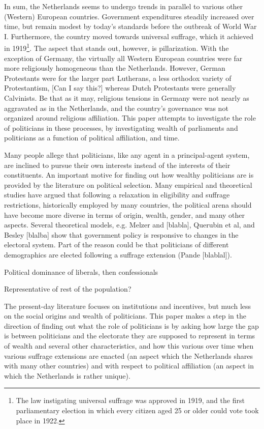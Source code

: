 In sum, the Netherlands seems to undergo trends in parallel to various other (Western) European countries. Government expenditures steadily increased over time, but remain modest by today's standards before the outbreak of World War I. Furthermore, the country moved towards universal suffrage, which it achieved in 1919\footnote{The law instigating universal suffrage was approved in 1919, and the first parliamentary election in which every citizen aged 25 or older could vote took place in 1922.}. The aspect that stands out, however, is pillarization. With the exception of Germany, the virtually all Western European countries were far more religiously homogeneous than the Netherlands. However, German Protestants were for the larger part Lutherans, a less orthodox variety of Protestantism, [Can I say this?] whereas Dutch Protestants were generally Calvinists. Be that as it may, religious tensions in Germany were not nearly as aggravated as in the Netherlands, and the country's governance was not organized around religious affiliation. This paper attempts to investigate the role of politicians in these processes, by investigating wealth of parliaments and politicians as a function of political affiliation, and time. 

Many people allege that politicians, like any agent in a principal-agent system, are inclined to pursue their own interests instead of the interests of their constituents. 
An important motive for finding out how wealthy politicians are is provided by the literature on political selection. Many empirical and theoretical studies have argued that following a relaxation in eligibility and suffrage restrictions, historically employed by many countries, the political arena should have become more diverse in terms of origin, wealth, gender, and many other aspects. Several theoretical models, e.g. Melzer and [blabla], Querubin et al, and Besley [blalba] show that government policy is responsive to changes in the electoral system. Part of the reason could be that politicians of different demographics are elected following a suffrage extension (Pande [blablal]). 

Political dominance of liberals, then confessionals

Representative of rest of the population?

The present-day literature focuses on institutions and incentives, but much less on the social origins and wealth of politicians. This paper makes a step in the direction of finding out what the role of politicians is by asking how large the gap is between politicians and the electorate they are supposed to represent in terms of wealth and several other characteristics, and how this various over time when various suffrage extensions are enacted (an aspect which the Netherlands shares with many other countries) and with respect to political affiliation (an aspect in which the Netherlands is rather unique). 


